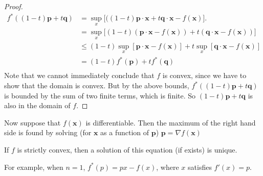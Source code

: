\documentclass[a4paper]{article}
\begin{document}
\begin{proof}
  \begin{align*}
    f^*((1 - t)\mathbf{p} + t\mathbf{q}) &= \sup_x \big[((1 - t)\mathbf{p}\cdot \mathbf{x} + t\mathbf{q}\cdot \mathbf{x} - f(\mathbf{x})\big].\\
    &= \sup_x \big[(1 - t)(\mathbf{p}\cdot \mathbf{x} - f(\mathbf{x})) + t(\mathbf{q}\cdot \mathbf{x} - f(\mathbf{x}))\big]\\
    &\leq (1 - t)\sup_x [\mathbf{p}\cdot \mathbf{x} - f(\mathbf{x})] + t\sup_x[\mathbf{q}\cdot \mathbf{x}  - f(\mathbf{x})]\\
    &= (1 - t)f^*(\mathbf{p}) + tf^*(\mathbf{q})\\
  \end{align*}
  Note that we cannot immediately conclude that $f$ is convex, since we have to show that the domain is convex. But by the above bounds, $f^*((1 - t)\mathbf{p} + t\mathbf{q})$  is bounded by the sum of two finite terms, which is finite. So $(1 - t)\mathbf{p} + t\mathbf{q}$ is also in the domain of $f$.
\end{proof}

Now suppose that $f(\mathbf{x})$ is differentiable. Then the maximum of the right hand side is found by solving (for $\mathbf{x}$ as a function of $\mathbf{p}$) $\mathbf{p} = \nabla f(\mathbf{x})$

If $f$ is strictly convex, then a solution of this equation (if exists) is unique.

For example, when $n = 1$, $f^*(p) = px - f(x)$, where $x$ satisfies $f'(x) = p$.

\begin{center}
\end{center}
\end{document}
